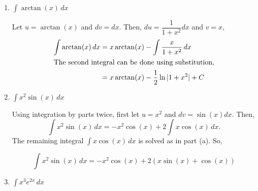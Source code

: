 \documentclass{article}
\begin{document}
\begin{enumerate}
\begin{enumerate}
\begin{solution}
    \begin{align*}
        \int (\ln x)^2 \, dx &=
        \ln(x)\left[x\ln(x)-x\right] - \int \frac{x\ln(x)-x}{x} \, dx \\
        &= x(\ln(x))^2 - x\ln(x) - \int (\ln(x) - 1)\, dx \\
        &= x(\ln(x))^2 - x\ln(x) - \int \ln(x)\, dx + \int 1\,dx\\
        &= x(\ln(x))^2 - x\ln(x) - [x\ln(x)-x] + x + C \\
        &= x(\ln(x))^2 - 2x\ln(x) + 2x + C
    \end{align*}

    \end{solution}


\item  
\begin{problem}[\vfill]
    $\displaystyle \int \arctan(x) \,dx $
\end{problem}

\begin{solution}
Let $u=\arctan(x)$ and $dv = dx$. Then, $du = \dfrac{1}{1+x^2}dx$ and $v=x$, 
\begin{align*}
\int \arctan(x)\,dx &= x\arctan(x) - \int \dfrac{x}{1+x^2}\,dx \\
\intertext{The second integral can be done using substitution,}
&= x\arctan(x) - \frac{1}{2}\ln|1+x^2| +C
\end{align*}
\end{solution}

\item  
\begin{problem}[\vfill]
    $\displaystyle \int x^2 \sin(x) \,dx $
\end{problem}

\begin{solution}
Using integration by parts twice, first let $u = x^2$ and $dv = \sin(x)dx$. Then, 
\[\int x^2 \sin(x) \,dx = -x^2\cos(x) + 2 \int x\cos(x) \,dx.\]
The remaining integral $\int x\cos(x) \,dx$ is solved as in part (a). So, 

$$\displaystyle \int x^2 \sin(x) \,dx = -x^2\cos(x) + 2 ( x\sin(x) + \cos(x))$$
\end{solution}

\item  
\begin{problem}[\vfill]
    $\displaystyle \int x^3 e^{2x} \,dx $
\end{problem}


\end{enumerate}
\end{enumerate}
\end{document}
